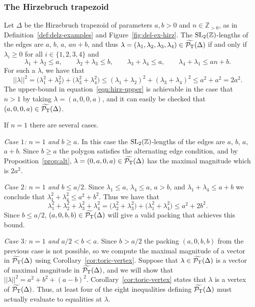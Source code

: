 \documentclass[pdftex]{sigma}
\numberwithin{equation}{section}
\def\Z{{\mathbb Z}}
\newcommand{\De}{\Delta}
\newcommand{\PT}{\mathcal{P}_{\rm T}}
\newcommand{\PTtilde}{\widetilde{\PT}}
\newcommand{\SL}{{\rm SL}_2(\Z)}
\begin{document}
\subsubsection{The Hirzebruch trapezoid}
\label{sec:hirz-packing}
Let $\De$ be the Hirzebruch trapezoid of parameters $a,b>0$ and $n\in \Z_{>0}$, as in Definition~\ref{def:delz-examples} and Figure~\ref{fig:del-ex-hirz}.
The $\SL$-lengths of the edges are $a$, $b$, $a$, $an+b$, and thus $\lambda = (\lambda_1,\lambda_2,\lambda_3,\lambda_4)\in\PTtilde(\De)$ if and only if $\lambda_i\geq 0$ for all $i\in\{1,2,3,4\}$ and
\begin{equation}\label{eqn:hirz-inequalities}
 \lambda_1+\lambda_2 \leq a,\qquad
 \lambda_2+\lambda_3 \leq b,\qquad
 \lambda_3+\lambda_4 \leq a,\qquad
 \lambda_4+\lambda_1 \leq an+b.
\end{equation}
For such a $\lambda$, we have that
\begin{equation}\label{eqn:hirz-upper}
 ||\lambda||^2 = \big(\lambda_1^2 + \lambda_2^2\big) + \big(\lambda_3^2 + \lambda_4^2\big) \leq (\lambda_1 + \lambda_2)^2 + (\lambda_3 + \lambda_4)^2 \leq a^2 + a^2 = 2a^2.
\end{equation}
The upper-bound in equation~\eqref{eqn:hirz-upper} is achievable in the case that $n>1$ by taking $\lambda = (a, 0, 0, a)$, and it can easily be checked that $(a,0,0,a)\in\PTtilde(\De)$.

If $n=1$ there are several cases.

{\it Case $1$: $n=1$ and $b\geq a$.} In this case the $\SL$-lengths of the edges are $a$, $b$, $a$, $a+b$. Since $b\geq a$ the polygon satisfies the alternating edge condition, and by Proposition~\ref{prop:alt}, $\lambda = (0,a,0,a)\in\PTtilde(\De)$ has the maximal magnitude which is $2a^2$.

{\it Case $2$: $n=1$ and $b\leq a/2$.} Since $\lambda_1\leq a$, $\lambda_4\leq a$, $a>b$, and $\lambda_1+\lambda_4\leq a+b$ we conclude that $\lambda_1^2+\lambda_4^2 \leq a^2 + b^2$.
Thus we have that
\[
 \lambda_1^2 + \lambda_2^2 + \lambda_3^2 + \lambda_4^2 = \big(\lambda_2^2 + \lambda_3^2\big) + \big(\lambda_1^2 + \lambda_4^2\big) \leq a^2 + 2b^2.
\]
Since $b\leq a/2$, $(a,0,b,b)\in\PTtilde(\De)$ will give a valid packing that achieves this bound.

{\it Case $3$: $n=1$ and $a/2 < b < a$.} Since $b>a/2$ the packing $(a,0,b,b)$ from the previous case is not possible, so we compute the maximal magnitude of a vector in $\PTtilde(\De)$ using Corollary~\ref{cor:toric-vertex}. Suppose that $\lambda\in\PTtilde(\De)$ is a vector of maximal magnitude in $\PTtilde(\De)$, and we will show that $||\lambda||^2 = a^2+b^2+(a-b)^2$. Corollary~\ref{cor:toric-vertex} states that $\lambda$ is a vertex of $\PTtilde(\De)$. Thus, at least four of the eight inequalities defining $\PTtilde(\De)$ must actually evaluate to equalities at $\lambda$.
\end{document}
